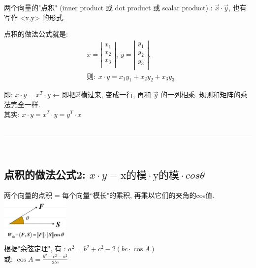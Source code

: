 \documentclass[UTF8]{ctexart}
\begin{document}
两个向量的"点积" (inner product  或 dot product 或 scalar product) : $\vec{x} \cdot \vec{y}$, 也有写作 <x,y> 的形式.

点积的做法公式就是:
\begin{align*}
	 & x=\left| \begin{array}{l}
		            x_1 \\
		            x_2 \\
		            x_3 \\
	            \end{array} \right|,\ y=\left| \begin{array}{l}
		                                           y_1 \\
		                                           y_2 \\
		                                           y_3 \\
	                                           \end{array} \right|, \\
	 & \text{则} :
	\boxed{
	\ x\cdot y = x_1 y_{1} + x_2 y_{2} + x_{3}y_{3}
	}
\end{align*}


即:   $x\cdot y = x^T \cdot y$  ← 即把$\vec{x}$横过来, 变成一行, 再和 $\vec{y}$ 的一列相乘. 规则和矩阵的乘法完全一样.\\
其实:   $x\cdot y = x^T \cdot y = y^T  \cdot x$\\

~\\
\hrule
~\\


\subsection{点积的做法公式2: $x \cdot y = \text{x的模} \cdot \text{y的模} \cdot cos \theta$}

两个向量的点积 = 每个向量``模长"的乘积, 再乘以它们的夹角的cos值. \\
\includegraphics[width=0.25\textwidth]{img/0095.png}\\

根据"余弦定理", 有 : $a^2 = b^2 + c^2 - 2(bc \cdot \cos A) $\\
或: $\cos A = \frac{b^2 + c^2 - a^2} {2bc}$\\
\end{document}
